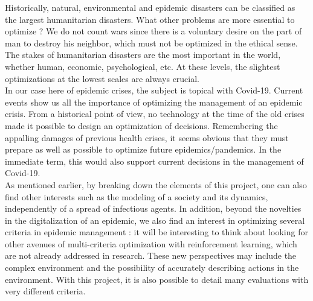 Historically, natural, environmental and epidemic disasters can be classified as the largest humanitarian disasters. What other problems are more essential to optimize ? We do not count wars since there is a voluntary desire on the part of man to destroy his neighbor, which must not be optimized in the ethical sense. The stakes of humanitarian disasters are the most important in the world, whether human, economic, psychological, etc. At these levels, the slightest optimizations at the lowest scales are always crucial.\\

In our case here of epidemic crises, the subject is topical with Covid-19. Current events show us all the importance of optimizing the management of an epidemic crisis. From a historical point of view, no technology at the time of the old crises made it possible to design an optimization of decisions. Remembering the appalling damages of previous health crises, it seems obvious that they must prepare as well as possible to optimize future epidemics/pandemics. In the immediate term, this would also support current decisions in the management of Covid-19.\\

As mentioned earlier, by breaking down the elements of this project, one can also find other interests such as the modeling of a society and its dynamics, independently of a spread of infectious agents. In addition, beyond the novelties in the digitalization of an epidemic, we also find an interest in optimizing several criteria in epidemic management : it will be interesting to think about looking for other avenues of multi-criteria optimization with reinforcement learning, which are not already addressed in research. These new perspectives may include the complex environment and the possibility of accurately describing actions in the environment. With this project, it is also possible to detail many evaluations with very different criteria.\\